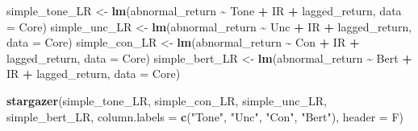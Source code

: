 \documentclass[
]{article}
\newenvironment{Shaded}{\begin{snugshade}}{\end{snugshade}}
\newcommand{\AttributeTok}[1]{\textcolor[rgb]{0.13,0.29,0.53}{#1}}
\newcommand{\FunctionTok}[1]{\textcolor[rgb]{0.13,0.29,0.53}{\textbf{#1}}}
\newcommand{\NormalTok}[1]{#1}
\newcommand{\OtherTok}[1]{\textcolor[rgb]{0.56,0.35,0.01}{#1}}
\newcommand{\SpecialCharTok}[1]{\textcolor[rgb]{0.81,0.36,0.00}{\textbf{#1}}}
\newcommand{\StringTok}[1]{\textcolor[rgb]{0.31,0.60,0.02}{#1}}
\begin{document}
\begin{Shaded}
\begin{Highlighting}[]
\NormalTok{simple\_tone\_LR }\OtherTok{\textless{}{-}} \FunctionTok{lm}\NormalTok{(abnormal\_return }\SpecialCharTok{\textasciitilde{}}\NormalTok{ Tone }\SpecialCharTok{+}\NormalTok{ IR }\SpecialCharTok{+}\NormalTok{ lagged\_return, }\AttributeTok{data =}\NormalTok{ Core)}
\NormalTok{simple\_unc\_LR }\OtherTok{\textless{}{-}} \FunctionTok{lm}\NormalTok{(abnormal\_return }\SpecialCharTok{\textasciitilde{}}\NormalTok{ Unc }\SpecialCharTok{+}\NormalTok{ IR }\SpecialCharTok{+}\NormalTok{ lagged\_return, }\AttributeTok{data =}\NormalTok{ Core)}
\NormalTok{simple\_con\_LR }\OtherTok{\textless{}{-}} \FunctionTok{lm}\NormalTok{(abnormal\_return }\SpecialCharTok{\textasciitilde{}}\NormalTok{ Con }\SpecialCharTok{+}\NormalTok{ IR }\SpecialCharTok{+}\NormalTok{ lagged\_return, }\AttributeTok{data =}\NormalTok{ Core)}
\NormalTok{simple\_bert\_LR }\OtherTok{\textless{}{-}} \FunctionTok{lm}\NormalTok{(abnormal\_return }\SpecialCharTok{\textasciitilde{}}\NormalTok{ Bert }\SpecialCharTok{+}\NormalTok{ IR }\SpecialCharTok{+}\NormalTok{ lagged\_return, }\AttributeTok{data =}\NormalTok{ Core)}

\FunctionTok{stargazer}\NormalTok{(simple\_tone\_LR, simple\_con\_LR, simple\_unc\_LR, simple\_bert\_LR, }\AttributeTok{column.labels =} \FunctionTok{c}\NormalTok{(}\StringTok{"Tone"}\NormalTok{, }\StringTok{"Unc"}\NormalTok{, }\StringTok{"Con"}\NormalTok{, }\StringTok{"Bert"}\NormalTok{), }\AttributeTok{header =}\NormalTok{ F)}
\end{Highlighting}
\end{Shaded}
\end{document}
